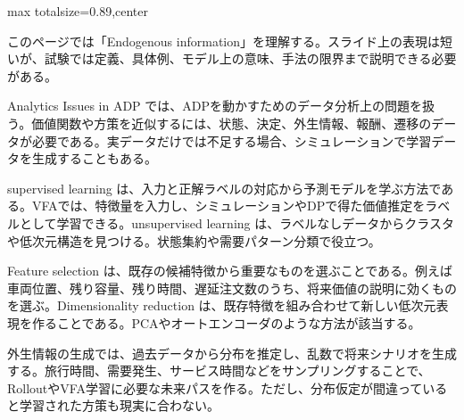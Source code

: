 \begin{minipage}[t]{0.58\textwidth}
\begin{adjustbox}{max totalsize={\textwidth}{0.89\textheight},center}
\begin{minipage}{\textwidth}\scriptsize
{}このページでは「Endogenous information」を理解する。スライド上の表現は短いが、試験では定義、具体例、モデル上の意味、手法の限界まで説明できる必要がある。\par
Analytics Issues in ADP では、ADPを動かすためのデータ分析上の問題を扱う。価値関数や方策を近似するには、状態、決定、外生情報、報酬、遷移のデータが必要である。実データだけでは不足する場合、シミュレーションで学習データを生成することもある。\par
supervised learning は、入力と正解ラベルの対応から予測モデルを学ぶ方法である。VFAでは、特徴量を入力し、シミュレーションやDPで得た価値推定をラベルとして学習できる。unsupervised learning は、ラベルなしデータからクラスタや低次元構造を見つける。状態集約や需要パターン分類で役立つ。\par
Feature selection は、既存の候補特徴から重要なものを選ぶことである。例えば車両位置、残り容量、残り時間、遅延注文数のうち、将来価値の説明に効くものを選ぶ。Dimensionality reduction は、既存特徴を組み合わせて新しい低次元表現を作ることである。PCAやオートエンコーダのような方法が該当する。\par
外生情報の生成では、過去データから分布を推定し、乱数で将来シナリオを生成する。旅行時間、需要発生、サービス時間などをサンプリングすることで、RolloutやVFA学習に必要な未来パスを作る。ただし、分布仮定が間違っていると学習された方策も現実に合わない。\par

\end{minipage}
\end{adjustbox}
\end{minipage}
